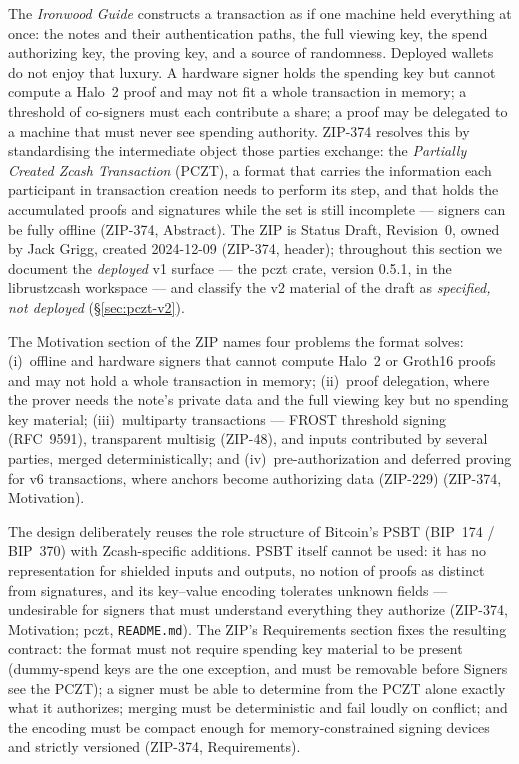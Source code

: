 \documentclass[11pt,a4paper]{article}
\theoremstyle{definition}
\begin{document}
The \emph{Ironwood Guide} constructs a transaction as if one machine held
everything at once: the notes and their authentication paths, the full
viewing key, the spend authorizing key, the proving key, and a source of
randomness. Deployed wallets do not enjoy that luxury. A hardware signer
holds the spending key but cannot compute a Halo~2 proof and may not fit a
whole transaction in memory; a threshold of co-signers must each contribute
a share; a proof may be delegated to a machine that must never see spending
authority. ZIP-374 resolves this by standardising the intermediate object
those parties exchange: the \emph{Partially Created Zcash Transaction}
(PCZT), a format that carries the information each participant in
transaction creation needs to perform its step, and that holds the
accumulated proofs and signatures while the set is still incomplete ---
signers can be fully offline (ZIP-374, Abstract). The ZIP is Status Draft,
Revision~0, owned by Jack Grigg, created 2024-12-09 (ZIP-374, header);
throughout this section we document the \emph{deployed} v1 surface --- the
\textsf{pczt} crate, version 0.5.1, in the librustzcash workspace --- and
classify the v2 material of the draft as \emph{specified, not deployed}
(\S\ref{sec:pczt-v2}).

The Motivation section of the ZIP names four problems the format solves:
(i)~offline and hardware signers that cannot compute Halo~2 or Groth16
proofs and may not hold a whole transaction in memory; (ii)~proof
delegation, where the prover needs the note's private data and the full
viewing key but no spending key material; (iii)~multiparty transactions ---
FROST threshold signing (RFC~9591), transparent multisig (ZIP-48),
and inputs contributed by several parties, merged deterministically; and
(iv)~pre-authorization and deferred proving for v6 transactions, where
anchors become authorizing data (ZIP-229) (ZIP-374, Motivation).

The design deliberately reuses the role structure of Bitcoin's PSBT
(BIP~174 / BIP~370) with Zcash-specific additions. PSBT itself cannot be
used: it has no representation for shielded inputs and outputs, no notion
of proofs as distinct from signatures, and its key--value encoding
tolerates unknown fields --- undesirable for signers that must understand
everything they authorize (ZIP-374, Motivation; \textsf{pczt},
\texttt{README.md}). The ZIP's Requirements section fixes the resulting
contract: the format must not require spending key material to be present
(dummy-spend keys are the one exception, and must be removable before
Signers see the PCZT); a signer must be able to determine from the PCZT
alone exactly what it authorizes; merging must be deterministic and fail
loudly on conflict; and the encoding must be compact enough for
memory-constrained signing devices and strictly versioned (ZIP-374,
Requirements).
\end{document}
